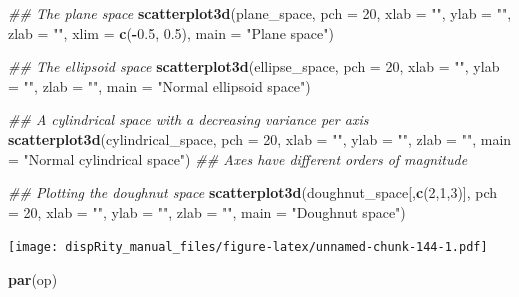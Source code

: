 \documentclass[
]{book}
\newenvironment{Shaded}{\begin{snugshade}}{\end{snugshade}}
\newcommand{\CommentTok}[1]{\textcolor[rgb]{0.56,0.35,0.01}{\textit{#1}}}
\newcommand{\DataTypeTok}[1]{\textcolor[rgb]{0.13,0.29,0.53}{#1}}
\newcommand{\DecValTok}[1]{\textcolor[rgb]{0.00,0.00,0.81}{#1}}
\newcommand{\FloatTok}[1]{\textcolor[rgb]{0.00,0.00,0.81}{#1}}
\newcommand{\KeywordTok}[1]{\textcolor[rgb]{0.13,0.29,0.53}{\textbf{#1}}}
\newcommand{\NormalTok}[1]{#1}
\newcommand{\OperatorTok}[1]{\textcolor[rgb]{0.81,0.36,0.00}{\textbf{#1}}}
\newcommand{\StringTok}[1]{\textcolor[rgb]{0.31,0.60,0.02}{#1}}
\begin{document}
\begin{Shaded}
\begin{Highlighting}[]
\CommentTok{\#\# The plane space}
\KeywordTok{scatterplot3d}\NormalTok{(plane\_space, }\DataTypeTok{pch =} \DecValTok{20}\NormalTok{, }\DataTypeTok{xlab =} \StringTok{""}\NormalTok{, }\DataTypeTok{ylab =} \StringTok{""}\NormalTok{, }\DataTypeTok{zlab =} \StringTok{""}\NormalTok{,}
              \DataTypeTok{xlim =} \KeywordTok{c}\NormalTok{(}\OperatorTok{{-}}\FloatTok{0.5}\NormalTok{, }\FloatTok{0.5}\NormalTok{), }\DataTypeTok{main =} \StringTok{"Plane space"}\NormalTok{)}

\CommentTok{\#\# The ellipsoid space}
\KeywordTok{scatterplot3d}\NormalTok{(ellipse\_space, }\DataTypeTok{pch =} \DecValTok{20}\NormalTok{, }\DataTypeTok{xlab =} \StringTok{""}\NormalTok{, }\DataTypeTok{ylab =} \StringTok{""}\NormalTok{, }\DataTypeTok{zlab =} \StringTok{""}\NormalTok{,}
              \DataTypeTok{main =} \StringTok{"Normal ellipsoid space"}\NormalTok{)}

\CommentTok{\#\# A cylindrical space with a decreasing variance per axis}
\KeywordTok{scatterplot3d}\NormalTok{(cylindrical\_space, }\DataTypeTok{pch =} \DecValTok{20}\NormalTok{, }\DataTypeTok{xlab =} \StringTok{""}\NormalTok{, }\DataTypeTok{ylab =} \StringTok{""}\NormalTok{, }\DataTypeTok{zlab =} \StringTok{""}\NormalTok{,}
              \DataTypeTok{main =} \StringTok{"Normal cylindrical space"}\NormalTok{)}
\CommentTok{\#\# Axes have different orders of magnitude}

\CommentTok{\#\# Plotting the doughnut space}
\KeywordTok{scatterplot3d}\NormalTok{(doughnut\_space[,}\KeywordTok{c}\NormalTok{(}\DecValTok{2}\NormalTok{,}\DecValTok{1}\NormalTok{,}\DecValTok{3}\NormalTok{)], }\DataTypeTok{pch =} \DecValTok{20}\NormalTok{, }\DataTypeTok{xlab =} \StringTok{""}\NormalTok{, }\DataTypeTok{ylab =} \StringTok{""}\NormalTok{,}
              \DataTypeTok{zlab =} \StringTok{""}\NormalTok{, }\DataTypeTok{main =} \StringTok{"Doughnut space"}\NormalTok{)}
\end{Highlighting}
\end{Shaded}

\texttt{[image: dispRity\_manual\_files/figure-latex/unnamed-chunk-144-1.pdf]}

\begin{Shaded}
\begin{Highlighting}[]
\KeywordTok{par}\NormalTok{(op)}
\end{Highlighting}
\end{Shaded}
\end{document}
